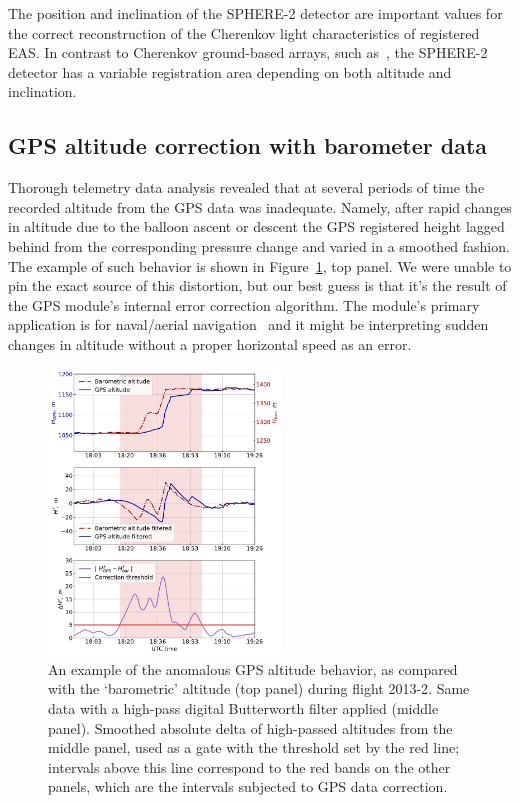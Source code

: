 \documentclass[universe,article,submit,moreauthors,pdftex]{Definitions/mdpi}
\begin{document}
\begin{paracol}{2}
The position and inclination of the SPHERE-2 detector are important values for the correct reconstruction of the Cherenkov light characteristics of registered EAS. In contrast to Cherenkov ground-based arrays, such as~\cite{Yakutsk19,TUNKA133}, the SPHERE-2 detector has a variable registration area depending on both altitude and inclination.

\subsection{GPS altitude correction with barometer data}
\label{sect:gps_correction}

Thorough telemetry data analysis revealed that at several periods of time the recorded altitude from the GPS data was inadequate. Namely, after rapid changes in altitude due to the balloon ascent or descent the GPS registered height lagged behind from the corresponding pressure change and varied in a smoothed fashion. The example of such behavior is shown in Figure~\ref{fig:h_corr}, top panel. We were unable to pin the exact source of this distortion, but our best guess is that it's the result of the GPS module's internal error correction algorithm. The module's primary application is for naval/aerial navigation~\cite{GPS-module-specs} and it might be interpreting sudden changes in altitude without a proper horizontal speed as an error.

\begin{figure}[tb]
    \includegraphics[width=0.55\textwidth]{figs/2013-2_gps_correction.pdf} 
    \caption{An example of the anomalous GPS altitude behavior, as compared with the `barometric' altitude (top panel) during flight 2013-2. Same data with a high-pass digital Butterworth filter applied (middle panel). Smoothed absolute delta of high-passed altitudes from the middle panel, used as a gate with the threshold set by the red line; intervals above this line correspond to the red bands on the other panels, which are the intervals subjected to GPS data correction.}
\label{fig:h_corr}
\end{figure}


\end{paracol}
\end{document}
